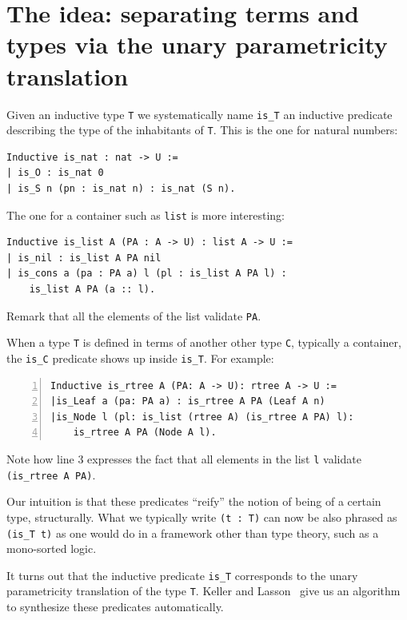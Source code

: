 \documentclass[sigplan,10pt,review]{acmart}\settopmatter{printfolios=true,printccs=false,printacmref=false}
\begin{document}
\section{The idea: separating terms and types via the unary parametricity translation}
\label{sec:idea}

Given an inductive type \lstinline+T+ we systematically name \lstinline+is_T+
an inductive predicate describing the type of the inhabitants of
\lstinline+T+. This is the one for natural numbers:

\begin{lstlisting}
Inductive is_nat : nat -> U :=
| is_O : is_nat 0
| is_S n (pn : is_nat n) : is_nat (S n).
\end{lstlisting}

\noindent
The one for a container such as \lstinline+list+ is more interesting:

\begin{lstlisting}
Inductive is_list A (PA : A -> U) : list A -> U :=
| is_nil : is_list A PA nil
| is_cons a (pa : PA a) l (pl : is_list A PA l) :
    is_list A PA (a :: l).
\end{lstlisting}

\noindent
Remark that all the elements of the list validate \lstinline+PA+.

When a type \lstinline+T+ is defined in terms of another other type
\lstinline+C+, typically a container, the \lstinline+is_C+ predicate
shows up inside \lstinline+is_T+. For example:

\begin{lstlisting}[numbers=left]
Inductive is_rtree A (PA: A -> U): rtree A -> U :=
|is_Leaf a (pa: PA a) : is_rtree A PA (Leaf A n)
|is_Node l (pl: is_list (rtree A) (is_rtree A PA) l):
    is_rtree A PA (Node A l).
\end{lstlisting}

\noindent
Note how line 3 expresses the fact that all elements in the list
\lstinline+l+ validate \lstinline+(is_rtree A PA)+.

Our intuition is that these predicates ``reify'' the notion of being
of a certain type, structurally. What we typically write \lstinline+(t : T)+
can now be also phrased as \lstinline+(is_T t)+ as one would do in a
framework other than type theory, such as a mono-sorted logic.

It turns out that the inductive predicate \lstinline+is_T+ corresponds
to the unary parametricity translation of the type \lstinline+T+.
Keller and Lasson~\cite{keller:hal-00730913} give us an
algorithm to synthesize these predicates automatically.
\end{document}
